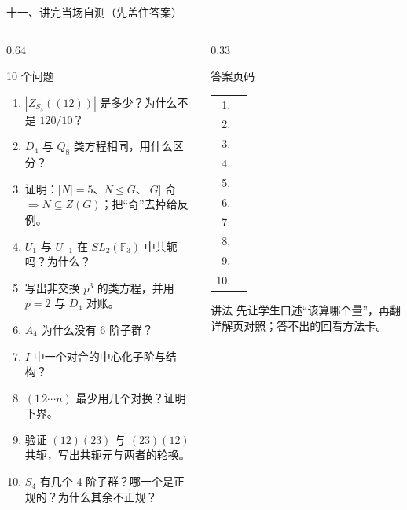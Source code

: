 \documentclass[aspectratio=169,10pt,fontset=none]{ctexbeamer}
\begin{document}
\begin{frame}[t]{十一、讲完当场自测（先盖住答案）}
  \label{sec:selftest}
  \begin{columns}[T,onlytextwidth]
    \begin{column}{0.64\textwidth}
      \begin{block}{\footnotesize 10 个问题}
        \scriptsize
        \begin{enumerate}\setlength{\itemsep}{2pt}
          \item $|Z_{S_5}((12))|$ 是多少？为什么不是 $120/10$？
          \item $D_4$ 与 $Q_8$ 类方程相同，用什么区分？
          \item 证明：$|N|=5$、$N\trianglelefteq G$、$|G|$ 奇 $\Rightarrow N\subseteq Z(G)$；把“奇”去掉给反例。
          \item $U_1$ 与 $U_{-1}$ 在 $SL_2(\mathbb F_3)$ 中共轭吗？为什么？
          \item 写出非交换 $p^3$ 的类方程，并用 $p=2$ 与 $D_4$ 对账。
          \item $A_4$ 为什么没有 6 阶子群？
          \item $I$ 中一个对合的中心化子阶与结构？
          \item $(1\,2\cdots n)$ 最少用几个对换？证明下界。
          \item 验证 $(12)(23)$ 与 $(23)(12)$ 共轭，写出共轭元与两者的轮换。
          \item $S_4$ 有几个 4 阶子群？哪一个是正规的？为什么其余不正规？
        \end{enumerate}
      \end{block}
    \end{column}
    \begin{column}{0.33\textwidth}
      \begin{exampleblock}{\footnotesize 答案页码}
        \scriptsize
        \begin{tabular}{@{}rl@{}}
          1. & \pageref{ex:G209}\\
          2. & \pageref{ex:G198}\\
          3. & \pageref{ex:G126}\\
          4. & \pageref{ex:LA199}\\
          5. & \pageref{ex:G197}\\
          6. & \pageref{ex:G202}\\
          7. & \pageref{ex:G201}\\
          8. & \pageref{ex:G208}\\
          9. & \pageref{ex:G212}\\
          10. & \pageref{ex:G213}\\
        \end{tabular}
      \end{exampleblock}
      \begin{alertblock}{\footnotesize 讲法}
        \scriptsize
        先让学生口述“该算哪个量”，再翻详解页对照；答不出的回看方法卡。
      \end{alertblock}
    \end{column}
  \end{columns}
\end{frame}
\end{document}
